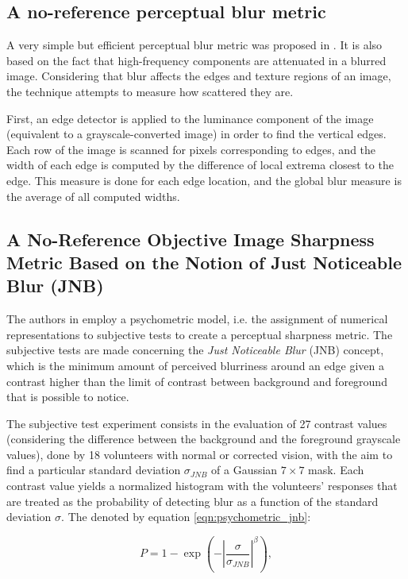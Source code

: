 \subsection{A no-reference perceptual blur metric}

A very simple but efficient perceptual blur metric was proposed in
\cite{marziliano2002noreference}. It is also based on the fact that high-frequency components are attenuated in a blurred image. Considering that blur affects the edges and texture regions of an image, the technique attempts to measure how scattered they are. 

First, an edge detector is applied to the luminance component of the image (equivalent to a grayscale-converted image) in order to find the vertical edges. Each row of the image is scanned for pixels corresponding to edges, and the width of each edge is computed by the difference of local extrema closest to the edge. This measure is done for each edge location, and the global blur measure is the average of all computed widths.

\subsection{A No-Reference Objective Image Sharpness Metric Based on the Notion of Just Noticeable Blur (JNB)}
\label{subsec:jnb_approach}

The authors in \cite{ferzli2009noreference} employ a psychometric model, i.e. the assignment of numerical representations to subjective tests to create a perceptual sharpness metric. The subjective tests are made concerning the \emph{Just Noticeable Blur} (JNB) concept, which is the minimum amount of perceived blurriness around an edge given a contrast higher than the limit of contrast between background and foreground that is possible to notice. 

The subjective test experiment consists in the evaluation of 27 contrast values (considering the difference between the background and the foreground grayscale values), done by 18 volunteers with normal or corrected vision, with the aim to find a particular standard deviation $\sigma_{JNB}$ of a Gaussian $7 \times 7$ mask. Each contrast value yields a normalized histogram with the volunteers' responses that are treated as the probability of detecting blur as a function of the standard deviation $\sigma$. The denoted by equation \ref{eqn:psychometric_jnb}:

\begin{equation}
\label{eqn:psychometric_jnb}
P = 1 - \exp{\left( - \left| \frac{\sigma}{\sigma_{JNB} } \right|^{\beta} \right)},
\end{equation}

